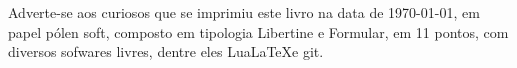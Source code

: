 \pagebreak


\ifodd\thepage\blankpage\fi

\parindent=0pt
\footnotesize\thispagestyle{empty}









\mbox{}\vfill
\begin{center}
		\begin{minipage}{.7\textwidth}\tiny\noindent{}
		\centering\tiny
		Adverte-se aos curiosos que se imprimiu este livro na data de \today, em papel pólen soft, composto em tipologia Libertine e Formular, em 11 pontos, com diversos sofwares livres,
		dentre eles Lua\LaTeX e git.\\ 
		\medskip\\\
		\end{minipage}
\end{center}
